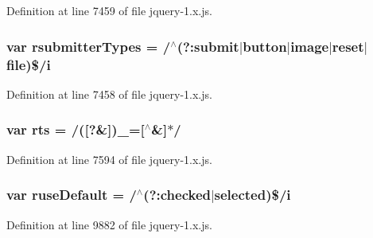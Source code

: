 Definition at line 7459 of file jquery-\/1.\+x.\+js.

\subsubsection[{\texorpdfstring{rsubmitter\+Types}{rsubmitterTypes}}]{\setlength{\rightskip}{0pt plus 5cm}var rsubmitter\+Types = /$^\wedge$(?\+:submit$\vert$button$\vert$image$\vert$reset$\vert${\bf file})\$/{\bf i}}\hypertarget{jquery-1_8x_8js_a0e9cd4ca08945afe827846f34a36c74a}{}\label{jquery-1_8x_8js_a0e9cd4ca08945afe827846f34a36c74a}


Definition at line 7458 of file jquery-\/1.\+x.\+js.

\subsubsection[{\texorpdfstring{rts}{rts}}]{\setlength{\rightskip}{0pt plus 5cm}var rts = /(\mbox{[}?\&\mbox{]})\+\_\+=\mbox{[}$^\wedge$\&\mbox{]}$\ast$/}\hypertarget{jquery-1_8x_8js_a38ff30904f54277281a13514d7aea00d}{}\label{jquery-1_8x_8js_a38ff30904f54277281a13514d7aea00d}


Definition at line 7594 of file jquery-\/1.\+x.\+js.

\subsubsection[{\texorpdfstring{ruse\+Default}{ruseDefault}}]{\setlength{\rightskip}{0pt plus 5cm}var ruse\+Default = /$^\wedge$(?\+:checked$\vert$selected)\$/{\bf i}}\hypertarget{jquery-1_8x_8js_a71b46062b4c90ce381b625c5f4c99c52}{}\label{jquery-1_8x_8js_a71b46062b4c90ce381b625c5f4c99c52}


Definition at line 9882 of file jquery-\/1.\+x.\+js.

